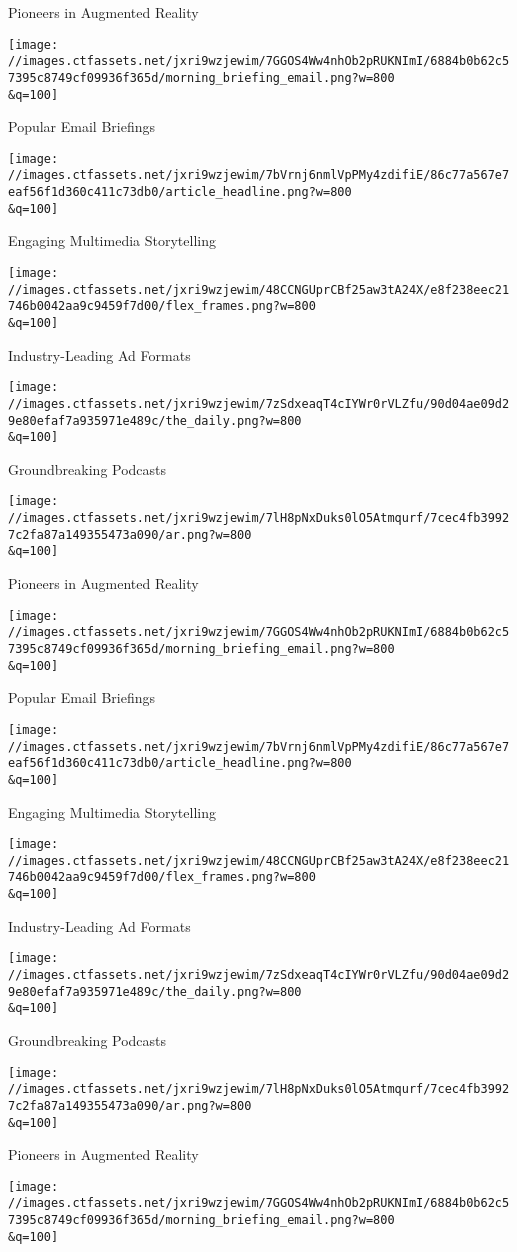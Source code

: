 Pioneers in Augmented Reality

\texttt{[image: //images.ctfassets.net/jxri9wzjewim/7GGOS4Ww4nhOb2pRUKNImI/6884b0b62c57395c8749cf09936f365d/morning\_briefing\_email.png?w=800\\\&q=100]}

Popular Email Briefings

\texttt{[image: //images.ctfassets.net/jxri9wzjewim/7bVrnj6nmlVpPMy4zdifiE/86c77a567e7eaf56f1d360c411c73db0/article\_headline.png?w=800\\\&q=100]}

Engaging Multimedia Storytelling

\texttt{[image: //images.ctfassets.net/jxri9wzjewim/48CCNGUprCBf25aw3tA24X/e8f238eec21746b0042aa9c9459f7d00/flex\_frames.png?w=800\\\&q=100]}

Industry-Leading Ad Formats

\texttt{[image: //images.ctfassets.net/jxri9wzjewim/7zSdxeaqT4cIYWr0rVLZfu/90d04ae09d29e80efaf7a935971e489c/the\_daily.png?w=800\\\&q=100]}

Groundbreaking Podcasts

\texttt{[image: //images.ctfassets.net/jxri9wzjewim/7lH8pNxDuks0lO5Atmqurf/7cec4fb39927c2fa87a149355473a090/ar.png?w=800\\\&q=100]}

Pioneers in Augmented Reality

\texttt{[image: //images.ctfassets.net/jxri9wzjewim/7GGOS4Ww4nhOb2pRUKNImI/6884b0b62c57395c8749cf09936f365d/morning\_briefing\_email.png?w=800\\\&q=100]}

Popular Email Briefings

\texttt{[image: //images.ctfassets.net/jxri9wzjewim/7bVrnj6nmlVpPMy4zdifiE/86c77a567e7eaf56f1d360c411c73db0/article\_headline.png?w=800\\\&q=100]}

Engaging Multimedia Storytelling

\texttt{[image: //images.ctfassets.net/jxri9wzjewim/48CCNGUprCBf25aw3tA24X/e8f238eec21746b0042aa9c9459f7d00/flex\_frames.png?w=800\\\&q=100]}

Industry-Leading Ad Formats

\texttt{[image: //images.ctfassets.net/jxri9wzjewim/7zSdxeaqT4cIYWr0rVLZfu/90d04ae09d29e80efaf7a935971e489c/the\_daily.png?w=800\\\&q=100]}

Groundbreaking Podcasts

\texttt{[image: //images.ctfassets.net/jxri9wzjewim/7lH8pNxDuks0lO5Atmqurf/7cec4fb39927c2fa87a149355473a090/ar.png?w=800\\\&q=100]}

Pioneers in Augmented Reality

\texttt{[image: //images.ctfassets.net/jxri9wzjewim/7GGOS4Ww4nhOb2pRUKNImI/6884b0b62c57395c8749cf09936f365d/morning\_briefing\_email.png?w=800\\\&q=100]}

